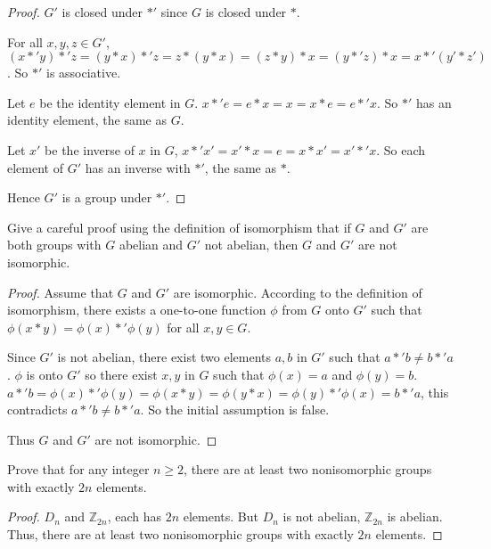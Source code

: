 \begin{proof}
    $G'$ is closed under $*'$ since $G$ is closed under $*$.

    For all $x, y, z\in G'$, $(x *' y) *' z = (y * x) *' z = z * (y * x) = (z * y) * x = (y *' z) * x = x *' (y' * z')$. So $*'$ is associative.

    Let $e$ be the identity element in $G$. $x *' e = e * x = x = x * e = e *' x$. So $*'$ has an identity element, the same as $G$.

    Let $x'$ be the inverse of $x$ in $G$, $x *' x' = x' * x = e = x * x' = x' *' x$. So each element of $G'$ has an inverse with $*'$, the same as $*$.

    Hence $G'$ is a group under $*'$.
\end{proof}

\begin{exercise}
    Give a careful proof using the definition of isomorphism that if $G$ and $G'$ are both groups with $G$ abelian and $G'$ not abelian, then $G$ and $G'$ are not isomorphic.
\end{exercise}

\begin{proof}
    Assume that $G$ and $G'$ are isomorphic. According to the definition of isomorphism, there exists a one-to-one function $\phi$ from $G$ onto $G'$ such that $\phi(x * y) = \phi(x) *' \phi(y)$ for all $x, y\in G$.

    Since $G'$ is not abelian, there exist two elements $a, b$ in $G'$ such that $a *' b \ne b *' a$. $\phi$ is onto $G'$ so there exist $x, y$ in $G$ such that $\phi(x) = a$ and $\phi(y) = b$. $a *' b = \phi(x) *' \phi(y) = \phi(x * y) = \phi(y * x) = \phi(y) *' \phi(x) = b *' a$, this contradicts $a *'b \ne b *' a$. So the initial assumption is false.

    Thus $G$ and $G'$ are not isomorphic.
\end{proof}

\begin{exercise}
    Prove that for any integer $n\geq 2$, there are at least two nonisomorphic groups with exactly $2n$ elements.
\end{exercise}

\begin{proof}
    $D_{n}$ and $\mathbb{Z}_{2n}$, each has $2n$ elements. But $D_{n}$ is not abelian, $\mathbb{Z}_{2n}$ is abelian. Thus, there are at least two nonisomorphic groups with exactly $2n$ elements.
\end{proof}

